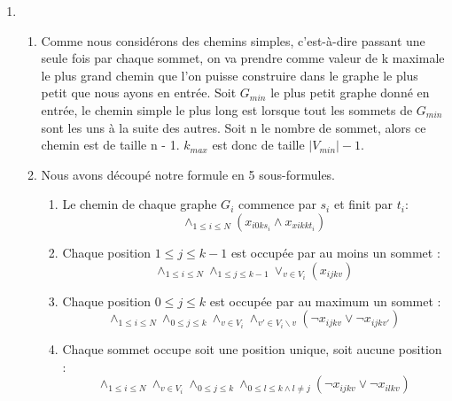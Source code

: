 \documentclass{article}
\begin{document}
\begin{enumerate}
\item \begin{enumerate}[label=(\alph*)]
\item
Comme nous considérons des chemins simples, c'est-à-dire passant une seule fois par chaque sommet, on va prendre comme valeur de k maximale le plus grand chemin que l'on puisse construire dans le graphe le plus petit que nous ayons en entrée. \newline
Soit $G_{min}$ le plus petit graphe donné en entrée, le chemin simple le plus long est lorsque tout les sommets de $G_{min}$ sont les uns à la suite des autres. Soit n le nombre de sommet, alors ce chemin est de taille n - 1.\newline
$k_{max}$ est donc de taille $|V_{min}| - 1$.\newline

\item 

Nous avons découpé notre formule en 5 sous-formules.
\begin{enumerate}
    \item
    Le chemin de chaque graphe $G_i$ commence par $s_i$ et finit par $t_i$: \newline
    $$
        \land_{1 \le i \le N} (x_{i0ks_i} \land x_{xikkt_i})
    $$
    \newline
    
    \item 
    Chaque position $1 \le j \le k - 1$ est occupée par au moins un sommet : \newline
    $$
        \land_{1 \le i \le N} \land_{1 \le j \le k - 1} \lor_{v \in V_i} (x_{ijkv})
    $$
    \newline
    
    \item
    Chaque position $0 \le j \le k$ est occupée par au maximum un sommet : \newline
    $$
        \land_{1 \le i \le N} \land_{0 \le j \le k} \land_{v \in V_i} \land_{v' \in V_i \backslash v} (\neg x_{ijkv} \lor \neg x_{ijkv'})
    $$
    \newline
    
    \item
    Chaque sommet occupe soit une position unique, soit aucune position : \newline
    $$
        \land_{1 \le i \le N} \land_{v \in V_i} \land_{0 \le j \le k} \land_{0 \le l \le k \land l \ne j} (\neg x_{ijkv} \lor \neg x_{ilkv})
    $$ 
    \newline
    

\end{enumerate}
\end{enumerate}
\end{enumerate}
\end{document}
